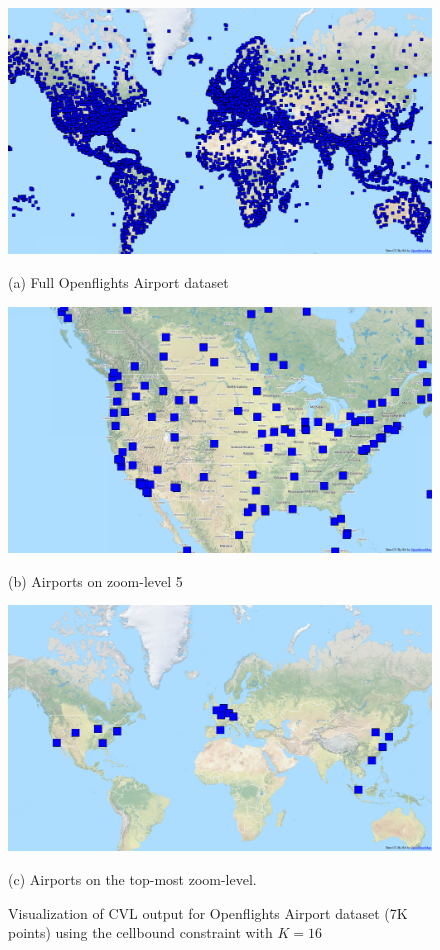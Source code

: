 \begin{figure}[tb]
  \begin{minipage}{0.329\linewidth}
    \centerline{\includegraphics[width=0.95\linewidth]{./figs/airports.png}}
    \centerline{(a) Full Openflights Airport dataset}
  \end{minipage} \hfill
  \begin{minipage}{0.329\linewidth}
    \centerline{\includegraphics[width=0.95\linewidth]{./figs/airports_z4.png}}
    \centerline{(b) Airports on zoom-level 5}
  \end{minipage} \hfill
  \begin{minipage}{0.329\linewidth}
    \centerline{\includegraphics[width=0.95\linewidth]{./figs/airports_z0.png}}
    \centerline{(c) Airports on the top-most zoom-level.}
  \end{minipage}
  \vspace{-0ex}
  \caption{Visualization of CVL output for Openflights Airport dataset (7K points) using the cellbound constraint with $K=16$} \label{fig:graphical:output:airport}
  \vspace{-2ex}
\end{figure}

